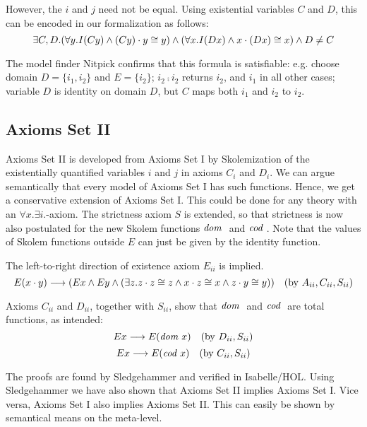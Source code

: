 However, the $i$ and $j$ need not be equal. Using existential
variables $C$ and $D$, this can be encoded in
   our formalization as follows: 
 $$\exists C, D. (\forall y. \textit{I\/} (C y) \wedge (C y) \cdot y \cong y)
 \wedge (\forall x. \textit{I\/} (D x) \wedge x \cdot (D x) \cong x) \wedge
 D \not= C$$

The model finder Nitpick confirms that this formula is satisfiable:
e.g. choose domain $D=\{i_1,i_2\}$ and $E=\{i_2\}$; $i_2\comp i_2$ returns $i_2$,  and $i_1$
in all other cases; variable $D$ is identity on domain $D$, but $C$ maps both
$i_1$ and $i_2$ to $i_2$. 



\subsection{Axioms Set II}
Axioms Set II is developed from Axioms Set I by Skolemization of the
existentially quantified variables $i$ and $j$ in axioms $C_i$ and
$D_i$. We can argue semantically that every model of Axioms Set I has
such functions. Hence, we get a conservative extension of Axioms Set
I. This could be done for any theory with an $\forall x. \exists i$.-axiom. The strictness axiom $S$ is extended, so
that strictness is now also postulated for the new Skolem functions
$\textit{dom \/}$ and $\textit{cod \/}$. Note that the values of Skolem functions
outside $E$ can just be given by the identity function.

The left-to-right direction of existence axiom $E_{ii}$ is implied. 
  $$E(x \cdot y) \longrightarrow (E x \wedge E y \wedge (\exists z. z \cdot z
  \cong z \wedge x \cdot z \cong x \wedge z\cdot y \cong y)) \quad
  (\text{by } A_{ii}, C_{ii}, S_{ii})$$

Axioms $C_{ii}$ and $D_{ii}$, together with $S_{ii}$, show that
${\textit{dom \/}}$ and ${\textit{cod \/}}$ are total functions, as intended: 
$$E x \longrightarrow E(\textit{dom \/} x) \quad (\text{by } D_{ii}, S_{ii})$$
$$E x \longrightarrow E(\textit{cod \/} x) \quad (\text{by } C_{ii}, S_{ii}) $$

The proofs are found by Sledgehammer and verified in Isabelle/HOL. Using Sledgehammer we have also
shown that Axioms Set II implies Axioms Set I. Vice versa, Axioms Set I
also implies Axioms Set II. This can easily 
be shown by semantical means on the meta-level.

